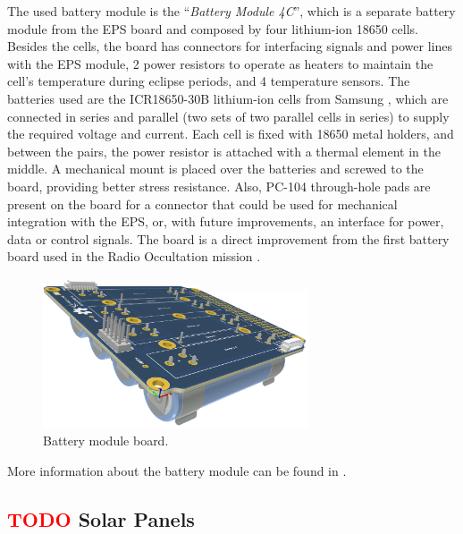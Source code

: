 The used battery module is the ``\textit{Battery Module 4C}'', which is a separate battery module from the EPS board and composed by four lithium-ion 18650 cells. Besides the cells, the board has connectors for interfacing signals and power lines with the EPS module, 2 power resistors to operate as heaters to maintain the cell's temperature during eclipse periods, and 4 temperature sensors. The batteries used are the ICR18650-30B lithium-ion cells from Samsung \cite{icr18650-30b}, which are connected in series and parallel (two sets of two parallel cells in series) to supply the required voltage and current. Each cell is fixed with 18650 metal holders, and between the pairs, the power resistor is attached with a thermal element in the middle. A mechanical mount is placed over the batteries and screwed to the board, providing better stress resistance. Also, PC-104 through-hole pads are present on the board for a connector that could be used for mechanical integration with the EPS, or, with future improvements, an interface for power, data or control signals. The board is a direct improvement from the first battery board used in the Radio Occultation mission \cite{floripasat}.

\begin{figure}[!ht]
    \begin{center}
        \includegraphics[width=0.7\textwidth]{figures/subsystems/bat2-pcb-3d}
        \caption{Battery module board.}
        \label{fig:battery-module-board}
    \end{center}
\end{figure}

More information about the battery module can be found in \cite{bat4c}.

\subsection{ \textcolor{red}{TODO} Solar Panels}


